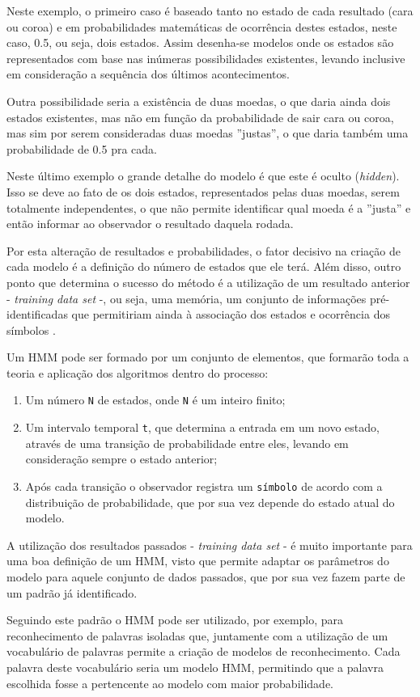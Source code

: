 Neste exemplo, o primeiro caso é baseado tanto no estado de cada resultado (cara ou coroa) e em probabilidades matemáticas de ocorrência destes estados, neste caso, 0.5, ou seja, dois estados. Assim desenha-se modelos onde os estados são representados com base nas inúmeras possibilidades existentes, levando inclusive em consideração a sequência dos últimos acontecimentos. \begin{textnew}Outra possibilidade seria a existência de duas moedas, o que daria ainda dois estados existentes, mas não em função da probabilidade de sair cara ou coroa, mas sim por serem consideradas duas moedas ''justas'', o que daria também uma probabilidade de 0.5 pra cada.

Neste último exemplo o grande detalhe do modelo é que este é oculto (\textit{hidden}). Isso se deve ao fato de os dois estados, representados pelas duas moedas, serem totalmente independentes, o que não permite identificar qual moeda é a ''justa'' e então informar ao observador o resultado daquela rodada.

Por esta alteração de resultados e probabilidades, o fator decisivo na criação de cada modelo é a definição do número de estados que ele terá. Além disso, outro ponto que determina o sucesso do método é a utilização de um resultado anterior - \textit{training data set} -, ou seja, uma memória, um conjunto de informações pré-identificadas que permitiriam ainda à associação dos estados e ocorrência dos símbolos \cite{Rabiner-HMM}.

Um HMM pode ser formado por um conjunto de elementos, que formarão toda a teoria e aplicação dos algoritmos dentro do processo:

\begin{enumerate}
    \item Um número \texttt{N} de estados, onde \texttt{N} é um inteiro finito;
    \item Um intervalo temporal \texttt{t}, que determina a entrada em um novo estado, através de uma transição de probabilidade entre eles, levando em consideração sempre o estado anterior;
    \item Após cada transição o observador registra um \texttt{símbolo} de acordo com a distribuição de probabilidade, que por sua vez depende do estado atual do modelo.
\end{enumerate}

A utilização dos resultados passados - \textit{training data set} - é muito importante para uma boa definição de um HMM, visto que permite adaptar os parâmetros do modelo para aquele conjunto de dados passados, que por sua vez fazem parte de um padrão já identificado.

Seguindo este padrão o HMM pode ser utilizado, por exemplo, para reconhecimento de palavras isoladas que, juntamente com a utilização de um vocabulário de palavras permite a criação de modelos de reconhecimento. Cada palavra deste vocabulário seria um modelo HMM, permitindo que a palavra escolhida fosse a pertencente ao modelo com maior probabilidade.

\end{textnew}


